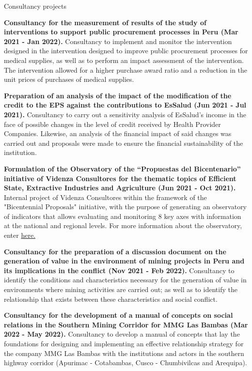 \documentclass{resume} %
\begin{document}
\begin{rSection}{Consultancy projects}
\item \textbf{Consultancy for the measurement of results of the study of interventions to support public procurement processes in Peru (Mar 2021 - Jan 2022).} {Consultancy to implement and monitor the intervention designed in the intervention designed to improve public procurement processes for medical supplies, as well as to perform an impact assessment of the intervention. The intervention allowed for a higher purchase award ratio and a reduction in the unit prices of purchases of medical supplies.}
\item \textbf{Preparation of an analysis of the impact of the modification of the credit to the EPS against the contributions to EsSalud (Jun 2021 - Jul 2021).} {Consultancy to carry out a sensitivity analysis of EsSalud's income in the face of possible changes in the level of credit received by Health Provider Companies. Likewise, an analysis of the financial impact of said changes was carried out and proposals were made to ensure the financial sustainability of the institution.}
\item \textbf{Formulation of the Observatory of the “Propuestas del Bicentenario” initiative of Videnza Consultores for the thematic topics of Efficient State, Extractive Industries and Agriculture (Jun 2021 - Oct 2021).} {Internal project of Videnza Consultores within the framework of the "Bicentennial Proposals" initiative, with the purpose of generating an observatory of indicators that allows evaluating and monitoring 8 key axes with information at the national and regional levels. For more information about the observatory, enter \href{https://propuestasdelbicentenario.pe/observatorio/}{here.}}
\item \textbf{Consultancy for the preparation of a discussion document on the generation of value in the environment of mining projects in Peru and its implications in the conflict (Nov 2021 - Feb 2022).} {Consultancy to identify the conditions and characteristics necessary for the generation of value in environments where mining activities are carried out; as well as to identify the relationship that exists between these characteristics and social conflict.}
\item \textbf{Consultancy for the development of a manual of concepts on social relations in the Southern Mining Corridor for MMG Las Bambas (Mar 2022 - May 2022).} {Consultancy to develop a manual of concepts that lay the foundations for designing and implementing an effective relationship strategy for the company MMG Las Bambas with the institutions and actors in the southern highway corridor (Apurimac - Cotabambas, Cusco - Chumbivilcas and Arequipa).}
\end{rSection} 
\end{document}
